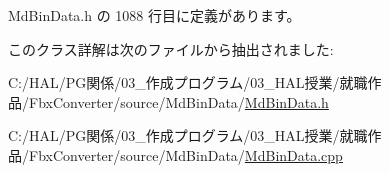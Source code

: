  Md\+Bin\+Data.\+h の 1088 行目に定義があります。



このクラス詳解は次のファイルから抽出されました\+:\begin{DoxyCompactItemize}
\item 
C\+:/\+H\+A\+L/\+P\+G関係/03\+\_\+作成プログラム/03\+\_\+\+H\+A\+L授業/就職作品/\+Fbx\+Converter/source/\+Md\+Bin\+Data/\mbox{\hyperlink{_md_bin_data_8h}{Md\+Bin\+Data.\+h}}\item 
C\+:/\+H\+A\+L/\+P\+G関係/03\+\_\+作成プログラム/03\+\_\+\+H\+A\+L授業/就職作品/\+Fbx\+Converter/source/\+Md\+Bin\+Data/\mbox{\hyperlink{_md_bin_data_8cpp}{Md\+Bin\+Data.\+cpp}}\end{DoxyCompactItemize}
